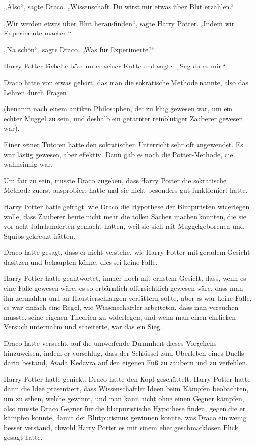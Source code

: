 {„Also“, sagte Draco. „Wissenschaft. Du wirst mir etwas über Blut erzählen.“

„Wir werden etwas über Blut herausfinden“, sagte Harry Potter. „Indem wir Experimente machen.“

„Na schön“, sagte Draco. „Was für Experimente?“

Harry Potter lächelte böse unter seiner Kutte und sagte: „Sag du es mir.“

Draco hatte von etwas gehört, das man die sokratische Methode nannte, also das Lehren durch Fragen

(benannt nach einem antiken Philosophen, der zu klug gewesen war, um ein echter Muggel zu sein, und deshalb ein getarnter reinblütiger Zauberer gewesen war).

Einer seiner Tutoren hatte den sokratischen Unterricht sehr oft angewendet. Es war lästig gewesen, aber effektiv. Dann gab es noch die Potter-Methode, die wahnsinnig war.

Um fair zu sein, musste Draco zugeben, dass Harry Potter die sokratische Methode zuerst ausprobiert hatte und sie nicht besonders gut funktioniert hatte.

Harry Potter hatte gefragt, wie Draco die Hypothese der Blutpuristen widerlegen wolle, dass Zauberer heute nicht mehr die tollen Sachen machen könnten, die sie vor acht Jahrhunderten gemacht hatten, weil sie sich mit Muggelgeborenen und Squibs gekreuzt hätten.

Draco hatte gesagt, dass er nicht verstehe, wie Harry Potter mit geradem Gesicht dasitzen und behaupten könne, dies sei keine Falle.

Harry Potter hatte geantwortet, immer noch mit ernstem Gesicht, dass, wenn es eine Falle gewesen wäre, es so erbärmlich offensichtlich gewesen wäre, dass man ihn zermahlen und an Haustierschlangen verfüttern sollte, aber es war keine Falle, es war einfach eine Regel, wie Wissenschaftler arbeiteten, dass man versuchen musste, seine eigenen Theorien zu widerlegen, und wenn man einen ehrlichen Versuch unternahm und scheiterte, war das ein Sieg.

Draco hatte versucht, auf die umwerfende Dummheit dieses Vorgehens hinzuweisen, indem er vorschlug, dass der Schlüssel zum Überleben eines Duells darin bestand, Avada Kedavra auf den eigenen Fuß zu zaubern und zu verfehlen.

Harry Potter hatte genickt. Draco hatte den Kopf geschüttelt. Harry Potter hatte dann die Idee präsentiert, dass Wissenschaftler Ideen beim Kämpfen beobachten, um zu sehen, welche gewinnt, und man kann nicht ohne einen Gegner kämpfen, also musste Draco Gegner für die blutpuristische Hypothese finden, gegen die er kämpfen konnte, damit der Blutpurismus gewinnen konnte, was Draco ein wenig besser verstand, obwohl Harry Potter es mit einem eher geschmacklosen Blick gesagt hatte.

}
